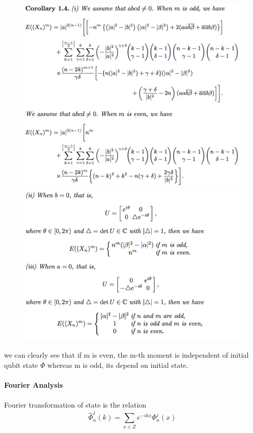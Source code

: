 \documentclass[11 pt]{article}
\theoremstyle{definition}
\theoremstyle{remark}
\begin{document}
\begin{figure}
    \centering
    \includegraphics[width=15cm]{Thm2.png}
    \includegraphics[width = 15cm]{Thm2_1.png}
\end{figure}
we can clearly see that if m is even, the m-th moment is independent of initial qubit state $\Phi$ whereas m is odd, its depend on initial state.
\\
\\
\textbf{Fourier Analysis}\\
\\
Fourier transformation of state is the relation
$$
\hat{\Phi}_{n}^{j}(k) = \sum_{x \in Z}e^{-ikx}\Phi_{n}^{j}(x)$$\\
\end{document}
